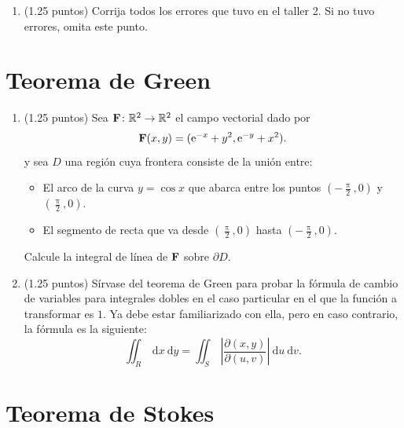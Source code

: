 \documentclass{fmbvecto}
\begin{document}
\begin{enumerate}

\item (1.25 puntos) Corrija todos los errores que tuvo en el taller 2. Si no tuvo errores, omita este punto.

\end{enumerate}

\section{Teorema de Green}

\begin{enumerate}

\item (1.25 puntos) Sea \(\boldsymbol{{\mathbf{F}}}\colon \mathbb{R}^2 \to \mathbb{R}^2\) el campo vectorial dado por
\[
  \boldsymbol{{\mathbf{F}}}(x, y) = (\mathrm{e}^{-x} + y^2, \mathrm{e}^{-y} + x^2).
\]
y sea \(D\) una región cuya frontera consiste de la unión entre:
\begin{itemize}
  \item El arco de la curva \(y = \cos x\) que abarca entre los puntos \(\left(-\frac{\uppi}{2}, 0\right)\) y \(\left(\frac{\uppi}{2}, 0\right)\).
  \item El segmento de recta que va desde \(\left(\frac{\uppi}{2}, 0\right)\) hasta \(\left(-\frac{\uppi}{2}, 0\right)\).
\end{itemize}
Calcule la integral de línea de \(\boldsymbol{{\mathbf{F}}}\) sobre \(\partial D\).

\item (1.25 puntos) Sírvase del teorema de Green para probar la fórmula de cambio de variables para integrales dobles en el caso particular en el que la función a transformar es \(1\). Ya debe estar familiarizado con ella, pero en caso contrario, la fórmula es la siguiente: 
\[
  \iint_R \: \mathrm{d}x \: \mathrm{d}y = \iint_S \: \left| \frac{\partial(x, y)}{\partial(u, v)} \right| \: \mathrm{d}u \: \mathrm{d}v.
\]
\end{enumerate}

\section{Teorema de Stokes}
\end{document}
